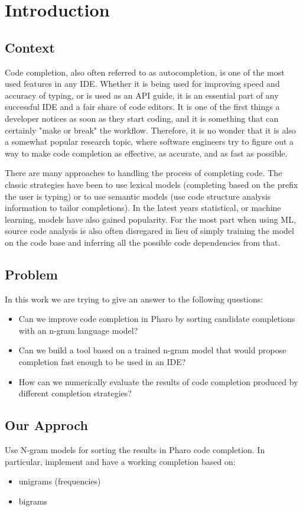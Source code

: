 \chapter{Introduction}
\label{chap:Introduction}

\section{Context}
Code completion, also often referred to as autocompletion, is one of the most
used features in any IDE. Whether it is being used for improving speed and
accuracy of typing, or is used as an API guide, it is an essential part of any
successful IDE and a fair share of code editors. It is one of the first things
a developer notices as soon as they start coding, and it is something that can
certainly "make or break" the workflow. Therefore, it is no wonder that it is
also a somewhat popular research topic, where software engineers try to figure out
a way to make code completion as effective, as accurate, and as fast as possible.

There are many approaches to handling the process of completing code. The classic
strategies have been to use lexical models (completing based on the prefix the user
is typing) or to use semantic models (use code structure analysis information to
tailor completions). In the latest years statistical, or machine learning, models
have also gained popularity. For the most part when using ML, source code analysis
is also often disregared in lieu of simply training the model on the code base and
inferring all the possible code dependencies from that.

\section{Problem}
\label{sec:Introduction-Problem}
In this work we are trying to give an answer to the following questions:
\begin{itemize}
    \item Can we improve code completion in Pharo by sorting candidate completions
    with an n-gram language model?
    \item Can we build a tool based on a trained n-gram model that would propose
    completion fast enough to be used in an IDE?
    \item How can we numerically evaluate the results of code completion produced
    by different completion strategies?
\end{itemize}

\section{Our Approch}
\label{sec:Introduction-Approach}
Use N-gram models for sorting the results in Pharo code completion.
In particular, implement and have a working completion based on:
\begin{itemize}
    \item unigrams (frequencies)
    \item bigrams
\end{itemize}